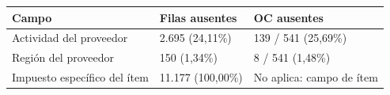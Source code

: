 \begin{tabularx}{\textwidth}{@{}Yp{0.23\textwidth}p{0.31\textwidth}@{}}
\toprule
Campo & Filas ausentes & OC ausentes\\
\midrule
Actividad del proveedor & 2.695 (24,11\%) & 139 / 541 (25,69\%) \\
Región del proveedor & 150 (1,34\%) & 8 / 541 (1,48\%) \\
Impuesto específico del ítem & 11.177 (100,00\%) & No aplica: campo de ítem \\
\bottomrule
\end{tabularx}
